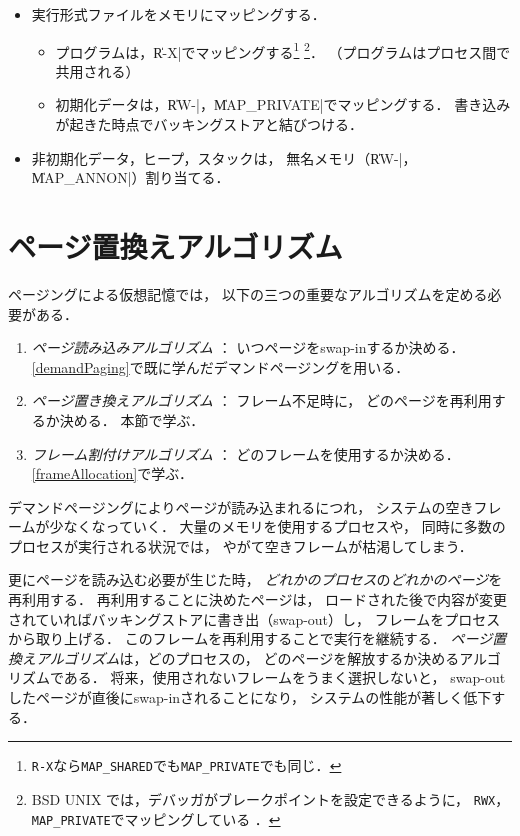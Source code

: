 \begin{itemize}
\item 実行形式ファイルをメモリにマッピングする．
  \begin{itemize}
  \item プログラムは，\|R-X|でマッピングする\footnote{
    \texttt{R-X}なら\texttt{MAP\_SHARED}でも\texttt{MAP\_PRIVATE}でも同じ．}
    \footnote{
      BSD UNIX では，デバッガがブレークポイントを設定できるように，
      \texttt{RWX}，\texttt{MAP\_PRIVATE}でマッピングしている
      \cite{execOfFreeBSD}．}．
         （プログラムはプロセス間で共用される）
  \item 初期化データは，\|RW-|，\|MAP_PRIVATE|でマッピングする．
    書き込みが起きた時点でバッキングストアと結びつける．
  \end{itemize}
\item 非初期化データ，ヒープ，スタックは，
  無名メモリ（\|RW-|，\|MAP_ANNON|）割り当てる．
\end{itemize}

\section{ページ置換えアルゴリズム}
ページングによる仮想記憶では，
以下の三つの重要なアルゴリズムを定める必要がある．

\begin{enumerate}
\item \emph{ページ読み込みアルゴリズム} ： いつページをswap-inするか決める．
  \ref{demandPaging}で既に学んだデマンドページングを用いる．
\item \emph{ページ置き換えアルゴリズム} ： フレーム不足時に，
  どのページを再利用するか決める．
  本節で学ぶ．
\item \emph{フレーム割付けアルゴリズム} ： どのフレームを使用するか決める．
  \ref{frameAllocation}で学ぶ．
\end{enumerate}

デマンドページングによりページが読み込まれるにつれ，
システムの空きフレームが少なくなっていく．
大量のメモリを使用するプロセスや，
同時に多数のプロセスが実行される状況では，
やがて空きフレームが枯渇してしまう．

更にページを読み込む必要が生じた時，
\emph{どれかのプロセス}の\emph{どれかのページ}を再利用する．
再利用することに決めたページは，
ロードされた後で内容が変更されていればバッキングストアに書き出（swap-out）し，
フレームをプロセスから取り上げる．
このフレームを再利用することで実行を継続する．
\emph{ページ置換えアルゴリズム}は，どのプロセスの，
どのページを解放するか決めるアルゴリズムである．
将来，使用されないフレームをうまく選択しないと，
swap-outしたページが直後にswap-inされることになり，
システムの性能が著しく低下する．

